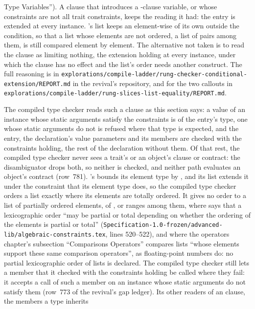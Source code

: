 \begin{description}
Type Variables'').
A clause that introduces a -clause variable, or whose
constraints are not all trait constraints, keeps the reading it had: the
entry is extended at every instance.
\library's list keeps an element-wise \EXP{=} of its own outside the
condition, so that a list whose elements are not ordered, a list of pairs
among them, is still compared element by element.
The alternative not taken is to read the clause as limiting nothing, the
extension holding at every instance, under which the clause has no effect
and the list's order needs another construct.
The full reasoning is in
\nolinkurl{explorations/compile-ladder/rung-checker-conditional-extension/REPORT.md}
in the revival's repository, and for the two callouts in
\nolinkurl{explorations/compile-ladder/rung-slices-list-equality/REPORT.md}.
\item[Effect] The compiled type checker reads such a clause as this
section says: a value of an instance whose static arguments satisfy the
constraints is of the entry's type, one whose static arguments do not is
refused where that type is expected, and the entry, the declaration's
value parameters and its members are checked with the constraints
holding, the rest of the declaration without them.
Of that rest, the compiled type checker never sees a trait's or an
object's  clause or contract: the disambiguator drops both, so
neither is checked, and neither path evaluates an object's contract
(row~781).
\library's  bounds its element type by
, and its list extends it under the constraint
that its element type does, so the compiled type checker orders a list
exactly where its elements are totally ordered.
It gives no order to a list of partially ordered elements, of ,
 or ranges among them, where  says
that a lexicographic order ``may be partial or total depending on whether the
ordering of the elements is partial or total''
(\nolinkurl{Specification-1.0-frozen/advanced-lib/algebraic-constraints.tex},
lines 520--522), and where the operators chapter's subsection
``Comparisons Operators'' compares lists ``whose elements support these same
comparison operators'', as floating-point numbers do: no partial
lexicographic order of lists is declared.
The compiled type checker still lets a member that it checked with the
constraints holding be called where they fail: it accepts a call of such
a member on an instance whose static arguments do not satisfy them
(row~773 of the revival's gap ledger).
Its other readers of an  clause, the members a type inherits

\end{description}
